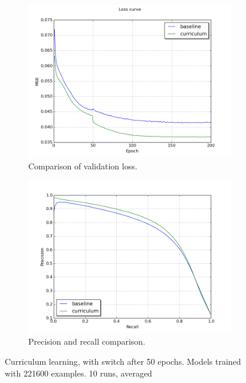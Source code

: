 \begin{figure}
\begin{subfigure}{0.48\textwidth}
\includegraphics[width=\linewidth]{figs/curr100/validation_loss_curve.png}
\caption{Comparison of validation loss.} \label{fig:curr100_loss}
\end{subfigure}
\hspace*{\fill} %
\begin{subfigure}{0.48\textwidth}
\includegraphics[width=\linewidth]{figs/curr100/validation_precision_recall.png}
\caption{Precision and recall comparison.} \label{fig:curr100_pr}
\end{subfigure}
\hspace*{\fill} %
\caption{Curriculum learning, with switch after 50 epochs. Models trained with 221600 examples. 10 runs, averaged} \label{fig:curr100}
\end{figure}


